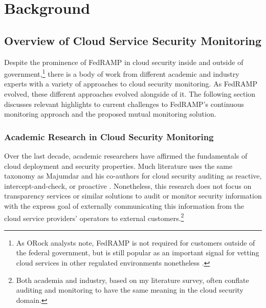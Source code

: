 \documentclass{jdf}
\begin{document}
\section{Background}

\subsection{Overview of Cloud Service Security Monitoring}

Despite the prominence of FedRAMP in cloud security inside and outside of government,\footnote{As ORock analysts note, FedRAMP is not required for customers outside of the federal government, but is still popular as an important signal for vetting cloud services in other regulated environments nonetheless \citeyear{orock21}.} there is a body of work from different academic and industry experts with a variety of approaches to cloud security monitoring. As FedRAMP evolved, these different approaches evolved alongside of it. The following section discusses relevant highlights to current challenges to FedRAMP's continuous monitoring approach and the proposed mutual monitoring solution.

\subsubsection{Academic Research in Cloud Security Monitoring}

Over the last decade, academic researchers have affirmed the fundamentals of cloud deployment and security properties. Much literature uses the same taxonomy as Majumdar and his co-authors for cloud security auditing as reactive, intercept-and-check, or proactive \citeyear[pp.~9-13]{majumdar19}. Nonetheless, this research does not focus on transparency services or similar solutions to audit or monitor security information with the express goal of externally communicating this information from the cloud service providers' operators to external customers.\footnote{Both academia and industry, based on my literature survey, often conflate auditing and monitoring to have the same meaning in the cloud security domain.}
\end{document}
